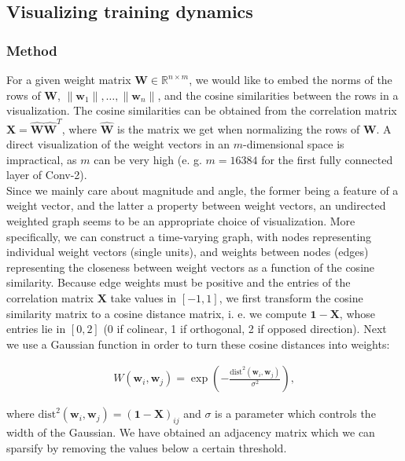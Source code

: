 \subsection{Visualizing training dynamics}

\subsubsection*{Method}
For a given weight matrix $\mathbf{W} \in \mathbb{R}^{n \times m}$, we would like to embed the norms of the rows of $\mathbf{W}$, $\|\mathbf{w}_1\|, \ldots, \|\mathbf{w}_n\|$, and the cosine similarities between the rows in a visualization. The cosine similarities can be obtained from the correlation matrix $\mathbf{X} = \hat{\mathbf{W}}\hat{\mathbf{W}}^T$, where $\hat{\mathbf{W}}$ is the matrix we get when normalizing the rows of $\textbf{W}$. A direct visualization of the weight vectors in an $m$-dimensional space is impractical, as $m$ can be very high (e. g. $m = 16384$ for the first fully connected layer of Conv-2). \\

Since we mainly care about magnitude and angle, the former being a feature of a weight vector, and the latter a property between weight vectors, an undirected weighted graph seems to be an appropriate choice of visualization. More specifically, we can construct a time-varying graph, with nodes representing individual weight vectors (single units), and weights between nodes (edges) representing the closeness between weight vectors as a function of the cosine similarity. Because edge weights must be positive and the entries of the correlation matrix $\mathbf{X}$ take values in $[-1, 1]$, we first transform the cosine similarity matrix to a cosine distance matrix, i. e. we compute $\mathbf{1} - \mathbf{X}$, whose entries lie in $[0, 2]$ (0 if colinear, 1 if orthogonal, 2 if opposed direction). Next we use a Gaussian function in order to turn these cosine distances into weights:

\begin{align*}
W(\textbf{w}_i, \textbf{w}_j) = \exp(-\frac{\text{dist}^2(\textbf{w}_i, \textbf{w}_j)}{\sigma^2}),
\end{align*}

where $\text{dist}^2(\textbf{w}_i, \textbf{w}_j) = (\mathbf{1} - \mathbf{X})_{ij}$ and $\sigma$ is a parameter which controls the width of the Gaussian. We have obtained an adjacency matrix which we can sparsify by removing the values below a certain threshold. \\

